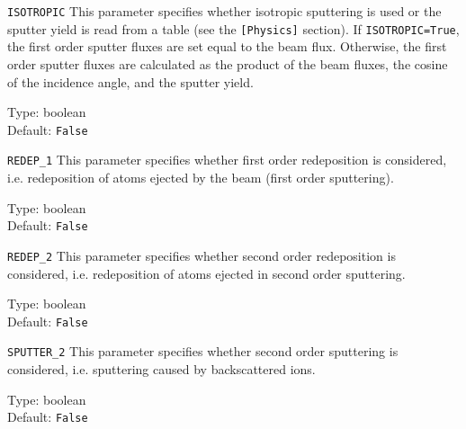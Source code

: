\begin{keydescription}{\texttt{ISOTROPIC}}
This parameter specifies whether isotropic sputtering is used or the sputter 
yield is read from a table (see the \texttt{[Physics]} section). If
\texttt{ISOTROPIC=True}, the first order sputter fluxes are set equal to the
beam flux. Otherwise, the first order sputter fluxes are calculated as the
product of the beam fluxes, the cosine of the incidence angle, and the sputter
yield.
\begin{keytab}
   Type:    \> boolean \\
   Default: \> \texttt{False}
\end{keytab}
\end{keydescription}

\begin{keydescription}{\texttt{REDEP\_1}}
This parameter specifies whether first order redeposition is considered, i.e.
redeposition of atoms ejected by the beam (first order sputtering).
\begin{keytab}
   Type:    \> boolean \\
   Default: \> \texttt{False}
\end{keytab}
\end{keydescription}

\begin{keydescription}{\texttt{REDEP\_2}}
This parameter specifies whether second order redeposition is considered, i.e.
redeposition of atoms ejected in second order sputtering.
\begin{keytab}
   Type:    \> boolean \\
   Default: \> \texttt{False}
\end{keytab}
\end{keydescription}

\begin{keydescription}{\texttt{SPUTTER\_2}}
This parameter specifies whether second order sputtering is considered, i.e.
sputtering caused by backscattered ions.
\begin{keytab}
   Type:    \> boolean \\
   Default: \> \texttt{False}
\end{keytab}
\end{keydescription}

